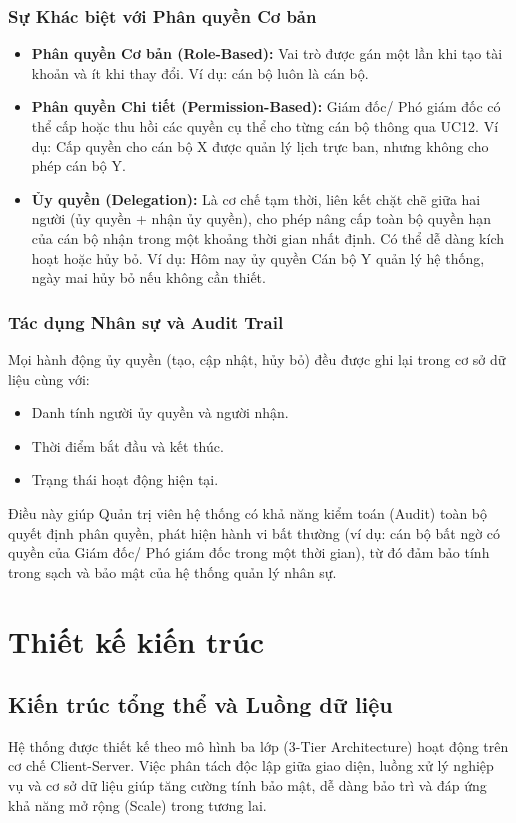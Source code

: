 \documentclass[18pt,a4paper]{report}
\begin{document}
\subsection{Sự Khác biệt với Phân quyền Cơ bản}
\begin{itemize}[leftmargin=1.2cm]
    \item \textbf{Phân quyền Cơ bản (Role-Based):} Vai trò được gán một lần khi tạo tài khoản và ít khi thay đổi. Ví dụ: cán bộ luôn là cán bộ.
    \item \textbf{Phân quyền Chi tiết (Permission-Based):} Giám đốc/ Phó giám đốc có thể cấp hoặc thu hồi các quyền cụ thể cho từng cán bộ thông qua UC12. Ví dụ: Cấp quyền cho cán bộ X được quản lý lịch trực ban, nhưng không cho phép cán bộ Y.
    \item \textbf{Ủy quyền (Delegation):} Là cơ chế tạm thời, liên kết chặt chẽ giữa hai người (ủy quyền + nhận ủy quyền), cho phép nâng cấp toàn bộ quyền hạn của cán bộ nhận trong một khoảng thời gian nhất định. Có thể dễ dàng kích hoạt hoặc hủy bỏ. Ví dụ: Hôm nay ủy quyền Cán bộ Y quản lý hệ thống, ngày mai hủy bỏ nếu không cần thiết.
\end{itemize}

\subsection{Tác dụng Nhân sự và Audit Trail}
Mọi hành động ủy quyền (tạo, cập nhật, hủy bỏ) đều được ghi lại trong cơ sở dữ liệu cùng với:
\begin{itemize}[leftmargin=1.2cm]
    \item Danh tính người ủy quyền và người nhận.
    \item Thời điểm bắt đầu và kết thúc.
    \item Trạng thái hoạt động hiện tại.
\end{itemize}
Điều này giúp Quản trị viên hệ thống có khả năng kiểm toán (Audit) toàn bộ quyết định phân quyền, phát hiện hành vi bất thường (ví dụ: cán bộ bất ngờ có quyền của Giám đốc/ Phó giám đốc trong một thời gian), từ đó đảm bảo tính trong sạch và bảo mật của hệ thống quản lý nhân sự.

\chapter{Thiết kế kiến trúc}

\section{Kiến trúc tổng thể và Luồng dữ liệu}
Hệ thống được thiết kế theo mô hình ba lớp (3-Tier Architecture) hoạt động trên cơ chế Client-Server. Việc phân tách độc lập giữa giao diện, luồng xử lý nghiệp vụ và cơ sở dữ liệu giúp tăng cường tính bảo mật, dễ dàng bảo trì và đáp ứng khả năng mở rộng (Scale) trong tương lai.
\end{document}
